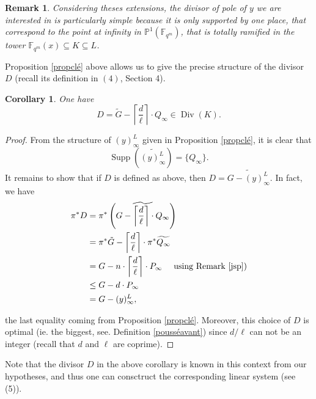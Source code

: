 \documentclass[10pt]{article}
\newtheorem{coro1}[thm]{Corollary}
\newtheorem{rq1}[thm]{Remark}
\newcommand{\s}{\vspace{0.3cm}}
\newcommand{\cd}{\cdot}
\newcommand{\PP}{\mathbb{P}}
\newcommand{\fqm}{\mathbb{F}_{q^m}}
\newcommand{\su}{\subseteq}
\newcommand{\Div}{\operatorname{Div}}
\newcommand{\Supp}{\operatorname{Supp}}
\begin{document}
\s

\begin{rq1} \rm Considering theses extensions, the divisor of pole of $y$ we are interested in is particularly simple because it is only supported by one place, that correspond to the point at infinity in $\PP^1(\fqm)$, that is totally ramified in the tower $\fqm(x)\su K \su L$.
\end{rq1}

\s

Proposition \ref{propclé} above allows us to give the precise structure of the divisor $D$ (recall its definition in $(4)$, Section 4).

\s

\begin{coro1} \label{diviseurDKummer}
One have
\[D = \tilde{G} - \left\lceil\frac{d}{\ell}\right\rceil \cd Q_{\infty} \in \Div(K).\]
\end{coro1}

\s

\begin{proof}
From the structure of $(y)^L_{\infty}$ given in Proposition \ref{propclé}, it is clear that 
\[\Supp\left(\widetilde{(y)^L_{\infty}}\right) = \{Q_{\infty}\}.\]
It remains to show that if $D$ is defined as above, then $D = \widetilde{G - (y)^L_{\infty}}$. In fact, we have
\begin{align*}
\pi^*D &= \pi^* \left(\widetilde{G - \left\lceil\frac{d}{\ell}\right\rceil \cd Q_{\infty}}\right) \\
&= \pi^*\tilde{G} - \left\lceil\frac{d}{\ell}\right\rceil \cd \pi^*\widetilde{Q_{\infty}} \\
&= G - n \cd \left\lceil\frac{d}{\ell}\right\rceil \cd P_{\infty} \ \quad \textrm{using Remark \ref{jsp}}) \\
& \leq G - d \cd P_{\infty} \\
&= G-(y)^L_{\infty},
\end{align*}

the last equality coming from Proposition \ref{propclé}. Moreover, this choice of $D$ is optimal (ie. the biggest, see. Definition \ref{pousséavant}) since $d/\ell$ can not be an integer (recall that $d$ and $\ell$ are coprime).
\end{proof}

\s

Note that the divisor $D$ in the above corollary is known in this context from our hypotheses, and thus one can consctruct the corresponding linear system (see (5)).
\end{document}
